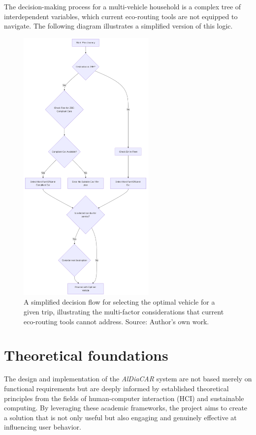 \textgap

The decision-making process for a multi-vehicle household is a complex tree of interdependent variables, which current eco-routing tools are not equipped to navigate. The following diagram illustrates a simplified version of this logic.

\textgap

\begin{figure}[H]
    \centering
    \includegraphics[width=0.6\textwidth]{images/background/simplified-decision-flow.png}
    \caption{A simplified decision flow for selecting the optimal vehicle for a given trip, illustrating the multi-factor considerations that current eco-routing tools cannot address. Source: Author's own work.}
\end{figure}

\section{Theoretical foundations}

The design and implementation of the \textit{AlDiaCAR} system are not based merely on functional requirements but are deeply informed by established theoretical principles from the fields of human-computer interaction (HCI) and sustainable computing. By leveraging these academic frameworks, the project aims to create a solution that is not only useful but also engaging and genuinely effective at influencing user behavior.

